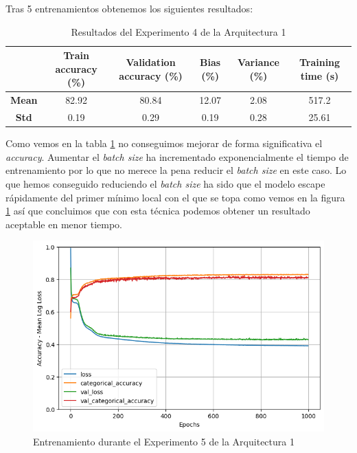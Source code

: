 \documentclass{article}
\begin{document}
			Tras 5 entrenamientos obtenemos los siguientes resultados:\\
			\begin{table}[!h]
				\begin{center}
					\begin{tabular}{ c | c | c | c | c | c |}
						\ & \textbf{Train accuracy (\%)} & \textbf{Validation accuracy (\%)} & \textbf{Bias (\%)} & \textbf{Variance (\%)} & \textbf{Training time (s)} \\ \hline
						\textbf{Mean} & 82.92 & 80.84 & 12.07 & 2.08 & 517.2\\ \hline
						\textbf{Std} & 0.19 & 0.29 & 0.19 & 0.28 & 25.61 \\ \hline
					\end{tabular}
					\caption{Resultados del Experimento 4 de la Arquitectura 1}
					\label{tab:res-a1-e5}
				\end{center}
			\end{table}
			Como vemos en la tabla \ref{tab:res-a1-e5} no conseguimos mejorar de forma significativa el \textit{accuracy}. Aumentar el \textit{batch size} ha incrementado exponencialmente el tiempo de entrenamiento por lo que no merece la pena reducir el \textit{batch size} en este caso. Lo que hemos conseguido reduciendo el \textit{batch size} ha sido que el modelo escape r\'apidamente del primer m\'inimo local con el que se topa como vemos en la figura \ref{tr-a1-e5} as\'i que concluimos que con esta t\'ecnica podemos obtener un resultado aceptable en menor tiempo.
			\begin{figure}[!h]
				\begin{center}
					\includegraphics[scale=0.5]{tr-a1-e5.png}		
					\caption{Entrenamiento durante el Experimento 5 de la Arquitectura 1}	
					\label{tr-a1-e5}
				\end{center}
			\end{figure}
			
\end{document}
